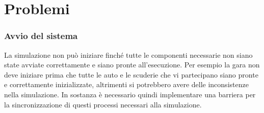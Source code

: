 \documentclass[11pt,a4paper]{report}
\begin{document}





\chapter{Problemi}
\subsection*{Avvio del sistema}
La simulazione non può iniziare finché tutte le componenti necessarie non siano state avviate correttamente e siano pronte all'esecuzione. Per esempio la gara non deve iniziare prima che tutte le auto e le scuderie che vi partecipano siano pronte e correttamente inizializzate, altrimenti si potrebbero avere delle inconsistenze nella simulazione. In sostanza è necessario quindi implementare una barriera per la sincronizzazione di questi processi necessari alla simulazione.
\end{document}
